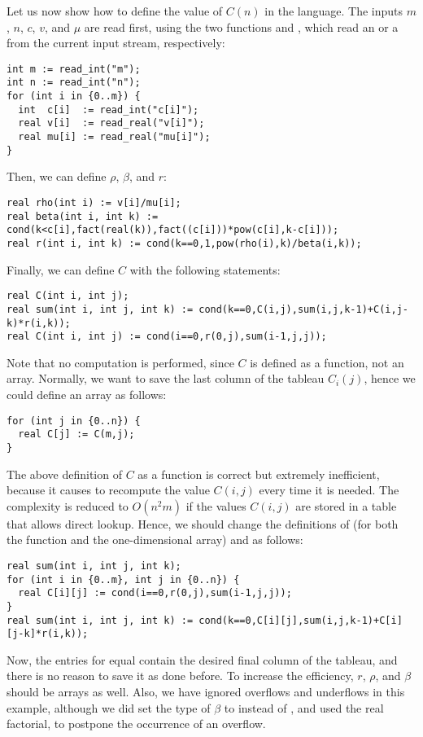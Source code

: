 Let us now show how to define the value of $C(n)$ in the {\smart} language.
The inputs $m$, $n$, $c$, $v$, and $\mu$ are read first,
using the two functions  and , which read an
 or a  from the current input stream, respectively:
\begin{lstlisting}
int m := read_int("m");
int n := read_int("n");
for (int i in {0..m}) {
  int  c[i]  := read_int("c[i]");
  real v[i]  := read_real("v[i]");
  real mu[i] := read_real("mu[i]");
}
\end{lstlisting}
Then, we can define $\rho$, $\beta$, and $r$:
\begin{lstlisting}
real rho(int i) := v[i]/mu[i];
real beta(int i, int k) := cond(k<c[i],fact(real(k)),fact((c[i]))*pow(c[i],k-c[i]));
real r(int i, int k) := cond(k==0,1,pow(rho(i),k)/beta(i,k));
\end{lstlisting}
Finally, we can define $C$ with the following statements:
\begin{lstlisting}
real C(int i, int j);
real sum(int i, int j, int k) := cond(k==0,C(i,j),sum(i,j,k-1)+C(i,j-k)*r(i,k));
real C(int i, int j) := cond(i==0,r(0,j),sum(i-1,j,j));
\end{lstlisting}
Note that no computation is performed, since $C$ is defined as a
function, not an array.  Normally, we want to save the last column of
the tableau $C_i(j)$, hence we could define an array as follows:
\begin{lstlisting}
for (int j in {0..n}) {
  real C[j] := C(m,j);
}
\end{lstlisting}

The above definition of $C$ as a function is correct but extremely
inefficient, because it causes {\smart} to recompute the value $C(i,j)$
every time it is needed.  The complexity is reduced to $O(n^2m)$ if
the values $C(i,j)$ are stored in a table that allows direct lookup.
Hence, we should change the definitions of  (for both the
function and the one-dimensional array) and  as follows:
\begin{lstlisting}
real sum(int i, int j, int k);
for (int i in {0..m}, int j in {0..n}) {
  real C[i][j] := cond(i==0,r(0,j),sum(i-1,j,j));
}
real sum(int i, int j, int k) := cond(k==0,C[i][j],sum(i,j,k-1)+C[i][j-k]*r(i,k));
\end{lstlisting}
Now, the entries  for  equal  contain the
desired final column of the tableau, and there is no reason to save it
as done before.  To increase the efficiency, $r$, $\rho$, and $\beta$
should be arrays as well.  Also, we have ignored overflows and
underflows in this example, although we did set the type of $\beta$ to
 instead of , and used the real factorial, to
postpone the occurrence of an overflow.


